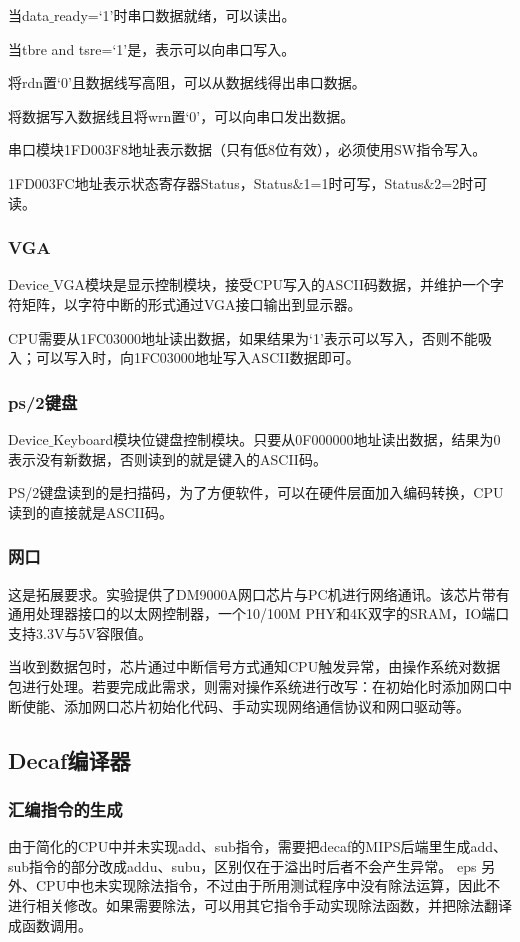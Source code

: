 当data$\_$ready=‘1’时串口数据就绪，可以读出。

当tbre and tsre=‘1’是，表示可以向串口写入。

将rdn置‘0’且数据线写高阻，可以从数据线得出串口数据。

将数据写入数据线且将wrn置‘0’，可以向串口发出数据。

串口模块1FD003F8地址表示数据（只有低8位有效），必须使用SW指令写入。

1FD003FC地址表示状态寄存器Status，Status$\&$1=1时可写，Status$\&$2=2时可读。
\subsubsection{VGA}
Device$\_$VGA模块是显示控制模块，接受CPU写入的ASCII码数据，并维护一个字符矩阵，以字符中断的形式通过VGA接口输出到显示器。

CPU需要从1FC03000地址读出数据，如果结果为‘1’表示可以写入，否则不能吸入；可以写入时，向1FC03000地址写入ASCII数据即可。
\subsubsection{ps/2键盘}
Device$\_$Keyboard模块位键盘控制模块。只要从0F000000地址读出数据，结果为0表示没有新数据，否则读到的就是键入的ASCII码。

PS/2键盘读到的是扫描码，为了方便软件，可以在硬件层面加入编码转换，CPU读到的直接就是ASCII码。
\subsubsection{网口}
这是拓展要求。实验提供了DM9000A网口芯片与PC机进行网络通讯。该芯片带有通用处理器接口的以太网控制器，一个10/100M PHY和4K双字的SRAM，IO端口支持3.3V与5V容限值。

当收到数据包时，芯片通过中断信号方式通知CPU触发异常，由操作系统对数据包进行处理。若要完成此需求，则需对操作系统进行改写：在初始化时添加网口中断使能、添加网口芯片初始化代码、手动实现网络通信协议和网口驱动等。
\subsection{Decaf编译器}
\subsubsection{汇编指令的生成}
由于简化的CPU中并未实现add、sub指令，需要把decaf的MIPS后端里生成add、sub指令的部分改成addu、subu，区别仅在于溢出时后者不会产生异常。
eps
另外、CPU中也未实现除法指令，不过由于所用测试程序中没有除法运算，因此不进行相关修改。如果需要除法，可以用其它指令手动实现除法函数，并把除法翻译成函数调用。
